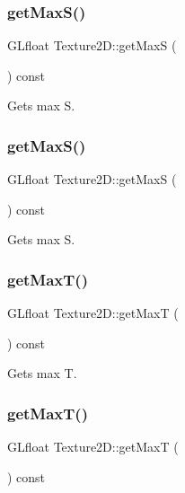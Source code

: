 \subsubsection{\texorpdfstring{get\+Max\+S()}{getMaxS()}\hspace{0.1cm}{\footnotesize\ttfamily [1/2]}}
{\footnotesize\ttfamily G\+Lfloat Texture2\+D\+::get\+MaxS (\begin{DoxyParamCaption}{ }\end{DoxyParamCaption}) const}

Gets max S. \mbox{\label{classTexture2D_ac5d32187817ecac6e541ab5d41900b16}} 
\subsubsection{\texorpdfstring{get\+Max\+S()}{getMaxS()}\hspace{0.1cm}{\footnotesize\ttfamily [2/2]}}
{\footnotesize\ttfamily G\+Lfloat Texture2\+D\+::get\+MaxS (\begin{DoxyParamCaption}{ }\end{DoxyParamCaption}) const}

Gets max S. \mbox{\label{classTexture2D_a1aca482857641c5f4d59afb90dd7ec9e}} 
\subsubsection{\texorpdfstring{get\+Max\+T()}{getMaxT()}\hspace{0.1cm}{\footnotesize\ttfamily [1/2]}}
{\footnotesize\ttfamily G\+Lfloat Texture2\+D\+::get\+MaxT (\begin{DoxyParamCaption}{ }\end{DoxyParamCaption}) const}

Gets max T. \mbox{\label{classTexture2D_a1aca482857641c5f4d59afb90dd7ec9e}} 
\subsubsection{\texorpdfstring{get\+Max\+T()}{getMaxT()}\hspace{0.1cm}{\footnotesize\ttfamily [2/2]}}
{\footnotesize\ttfamily G\+Lfloat Texture2\+D\+::get\+MaxT (\begin{DoxyParamCaption}{ }\end{DoxyParamCaption}) const}

